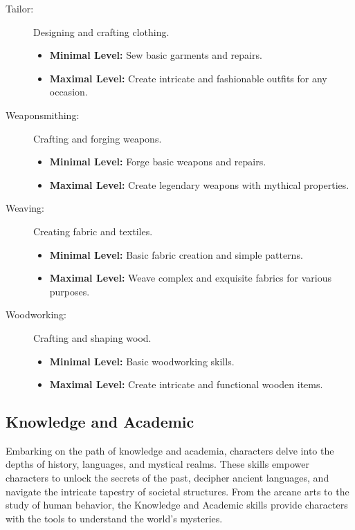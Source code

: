 \begin{description}
    \item[Tailor:] Designing and crafting clothing.
        \begin{itemize}
            \item \textbf{Minimal Level:} Sew basic garments and repairs.
            \item \textbf{Maximal Level:} Create intricate and fashionable outfits for any occasion.
        \end{itemize}

    \item[Weaponsmithing:] Crafting and forging weapons.
        \begin{itemize}
            \item \textbf{Minimal Level:} Forge basic weapons and repairs.
            \item \textbf{Maximal Level:} Create legendary weapons with mythical properties.
        \end{itemize}

    \item[Weaving:] Creating fabric and textiles.
        \begin{itemize}
            \item \textbf{Minimal Level:} Basic fabric creation and simple patterns.
            \item \textbf{Maximal Level:} Weave complex and exquisite fabrics for various purposes.
        \end{itemize}

    \item[Woodworking:] Crafting and shaping wood.
        \begin{itemize}
            \item \textbf{Minimal Level:} Basic woodworking skills.
            \item \textbf{Maximal Level:} Create intricate and functional wooden items.
        \end{itemize}
\end{description}

\subsection{\textbf{Knowledge and Academic}}

Embarking on the path of knowledge and academia, characters delve into the depths of history, languages, and mystical realms. These skills empower characters to unlock the secrets of the past, decipher ancient languages, and navigate the intricate tapestry of societal structures. From the arcane arts to the study of human behavior, the Knowledge and Academic skills provide characters with the tools to understand the world's mysteries.

